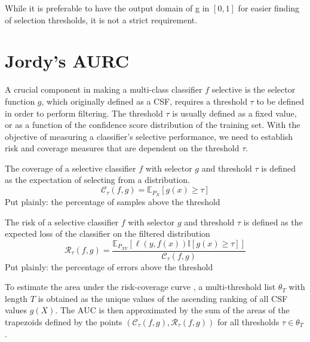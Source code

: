 While it is preferable to have the output domain of g in $[0,1]$ for easier finding of selection thresholds, it is not a strict requirement.

\section*{Jordy's AURC}

A crucial component in making a multi-class classifier $f$ selective is the selector function $g$, which originally defined as a CSF, requires a threshold $\tau$ to be defined in order to perform filtering. The threshold $\tau$ is usually defined as a fixed value, or as a function of the confidence score distribution of the training set.
With the objective of measuring a classifier's selective performance, we need to establish risk and coverage measures that are dependent on the threshold $\tau$.

\begin{definition}[Coverage]
    The coverage of a selective classifier $f$ with selector $g$ and threshold $\tau$ is defined as the expectation of selecting from a distribution.
    \begin{equation}
        \mathcal{C}_{\tau}(f, g)=\mathbb{E}_{P_X}\left[g(x) \geq \tau\right]
    \end{equation}
    Put plainly: the percentage of samples above the threshold %
\end{definition}

\begin{definition}[Risk]
    The risk of a selective classifier $f$ with selector $g$ and threshold $\tau$ is defined as the expected loss of the classifier on the filtered distribution
    \begin{equation}
        \mathcal{R}_{\tau}(f, g)=\frac{\mathbb{E}_{P_{XY}}\left[\ell\left(y, f(x)\right) \mathbb{I}\left[g(x) \geq \tau\right]  \right]}{\mathcal{C}_{\tau}(f, g)} %
    \end{equation}
    Put plainly: the percentage of errors above the threshold %
\end{definition}

To estimate the area under the risk-coverage curve \AURC{}, a multi-threshold list $\theta_T$ with length $T$ is obtained as the unique values of the ascending ranking of all CSF values $g(X)$. The $\mathrm{AUC}$ is then approximated by the sum of the areas of the trapezoids defined by the points $(\mathcal{C}_{\tau}(f, g), \mathcal{R}_{\tau}(f, g))$ for all thresholds $\tau \in \theta_T$.

